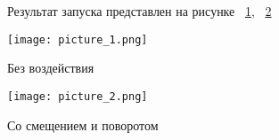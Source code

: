 \documentclass[a4paper, 14pt]{extarticle}
\begin{document}
\begin{figure}[!htb]
Результат запуска представлен на рисунке ~\ref{fig:picture_1.png}, ~\ref{fig:picture_2.png}
\end{figure}

\begin{figure}[!htb]
	\centering
	\texttt{[image: picture\_1.png]}
\caption{Без воздействия}
\label{fig:picture_1.png}
\end{figure}

\begin{figure}[!htb]
	\centering
	\texttt{[image: picture\_2.png]}
\caption{Со смещением и поворотом}
\label{fig:picture_2.png}
\end{figure}
\end{document}
